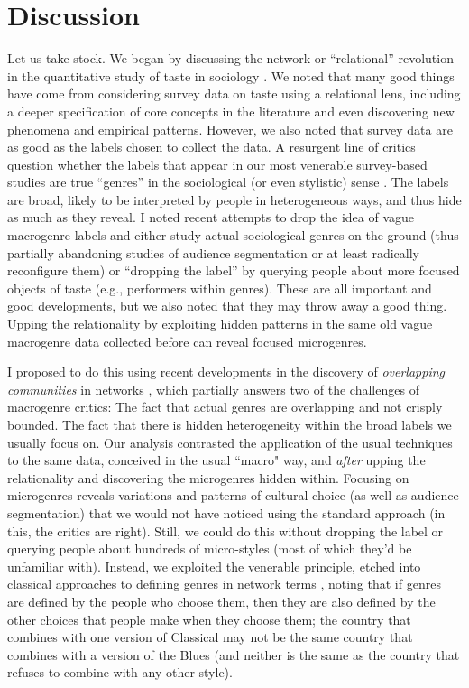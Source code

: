 \documentclass[a4paper,12pt]{extarticle}
\begin{document}
\section{Discussion}
Let us take stock. We began by discussing the network or ``relational'' revolution in the quantitative study of taste in sociology \citep{pachucki2010cultural}. We noted that many good things have come from considering survey data on taste using a relational lens, including a deeper specification of core concepts in the literature and even discovering new phenomena and empirical patterns. However, we also noted that survey data are as good as the labels chosen to collect the data. A resurgent line of critics question whether the labels that appear in our most venerable survey-based studies are true ``genres'' in the sociological (or even stylistic) sense \citep{lena2015relational, vlegels2015music}. The labels are broad, likely to be interpreted by people in heterogeneous ways, and thus hide as much as they reveal. I noted recent attempts to drop the idea of vague macrogenre labels and either study actual sociological genres on the ground (thus partially abandoning studies of audience segmentation or at least radically reconfigure them) or ``dropping the label'' \citep{sonnett2016ambivalence} by querying people about more focused objects of taste (e.g., performers within genres). These are all important and good developments, but we also noted that they may throw away a good thing. Upping the relationality by exploiting hidden patterns in the same old vague macrogenre data collected before can reveal focused microgenres. 

I proposed to do this using recent developments in the discovery of \textit{overlapping communities} in networks \citep{ahn_etal10}, which partially answers two of the challenges of macrogenre critics: The fact that actual genres are overlapping and not crisply bounded. The fact that there is hidden heterogeneity within the broad labels we usually focus on. Our analysis contrasted the application of the usual techniques to the same data, conceived in the usual ``macro" way, and \textit{after} upping the relationality and discovering the microgenres hidden within. Focusing on microgenres reveals variations and patterns of cultural choice (as well as audience segmentation) that we would not have noticed using the standard approach (in this, the critics are right). Still, we could do this without dropping the label or querying people about hundreds of micro-styles (most of which they'd be unfamiliar with). Instead, we exploited the venerable principle, etched into classical approaches to defining genres in network terms \citep{dimaggio1987classification}, noting that if genres are defined by the people who choose them, then they are also defined by the other choices that people make when they choose them; the country that combines with one version of Classical may not be the same country that combines with a version of the Blues (and neither is the same as the country that refuses to combine with any other style). 
\end{document}
